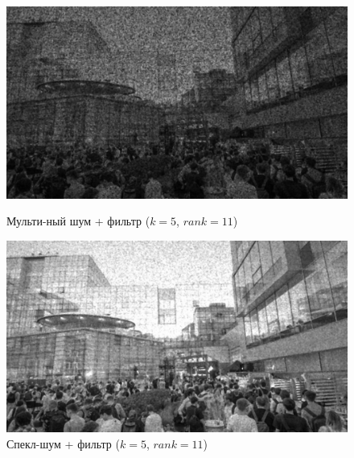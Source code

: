 \documentclass[a4paper]{article}
\begin{document}
\begin{figure}[H]
    \begin{minipage}{0.49\textwidth}
        \centering \includegraphics[width=\textwidth]{images/3_nonlinear_filters/multiplicative - rang (k=5, rank=11).jpg}
        \caption{Мульти-ный шум + фильтр ($k = 5$, $rank = 11$)}
    \end{minipage}\hfill
    \begin{minipage}{0.49\textwidth}
        \centering \includegraphics[width=\textwidth]{images/3_nonlinear_filters/speckle - rang (k=5, rank=11).jpg}
        \caption{Спекл-шум + фильтр ($k = 5$, $rank = 11$)}
    \end{minipage}
\end{figure}
\end{document}
